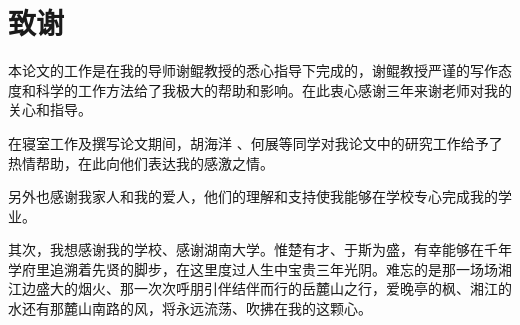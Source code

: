 \chapter*{致\quad 谢}
本论文的工作是在我的导师谢鲲教授的悉心指导下完成的，谢鲲教授严谨的写作态度和科学的工作方法给了我极大的帮助和影响。在此衷心感谢三年来谢老师对我的关心和指导。



在寝室工作及撰写论文期间，胡海洋 、何展等同学对我论文中的研究工作给予了热情帮助，在此向他们表达我的感激之情。

另外也感谢我家人和我的爱人，他们的理解和支持使我能够在学校专心完成我的学业。

其次，我想感谢我的学校、感谢湖南大学。惟楚有才、于斯为盛，有幸能够在千年学府里追溯着先贤的脚步，在这里度过人生中宝贵三年光阴。难忘的是那一场场湘江边盛大的烟火、那一次次呼朋引伴结伴而行的岳麓山之行，爱晚亭的枫、湘江的水还有那麓山南路的风，将永远流荡、吹拂在我的这颗心。


